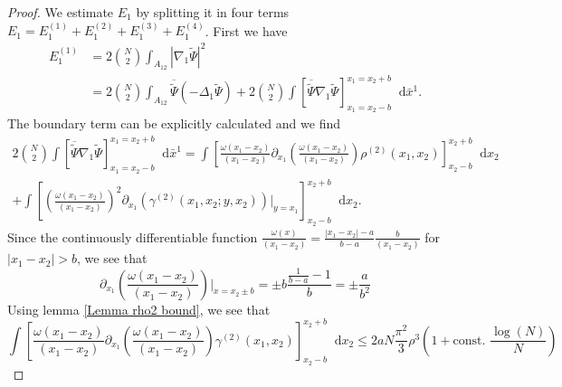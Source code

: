 \documentclass[a4paper,11pt]{article}
\newcommand{\abs}[1]{\left\lvert #1 \right\rvert}
\newcommand*\diff{\mathop{}\!\mathrm{d}}
\numberwithin{equation}{section}
\begin{document}
		\begin{proof}
		We estimate $ E_1 $ by splitting it in four terms $ E_1=E_1^{(1)}+E_1^{(2)}+E_1^{(3)}+E_1^{(4)} $. First we have \begin{equation}
		\begin{aligned}
		E_1^{(1)}&=2\binom{N}{2}\int_{A_{12}}\abs{\nabla_1\tilde{\Psi}}^2\\&
		=2\binom{N}{2}\int_{A_{12}}\overline{\tilde{\Psi}}\left( -\Delta_1 \tilde{\Psi} \right)+2\binom{N}{2}\int\left[\overline{\tilde{\Psi}}\nabla_1\tilde{\Psi}\right]_{x_1=x_2-b}^{x_1=x_2+b}\diff \bar{x}^1.
		\end{aligned}
		\end{equation}
		The boundary term can be explicitly calculated and we find \begin{equation}
		\begin{aligned}
		2\binom{N}{2}\int\left[\overline{\tilde{\Psi}}\nabla_1\tilde{\Psi}\right]_{x_1=x_2-b}^{x_1=x_2+b}\diff \bar{x}^1=\int\left[\frac{\omega(x_1-x_2)}{(x_1-x_2)}\partial_{x_1}\left(\frac{\omega(x_1-x_2)}{(x_1-x_2)}\right)\rho^{(2)}(x_1,x_2)\right]_{x_2-b}^{x_2+b}\diff x_2\\+\int\left[\left(\frac{\omega(x_1-x_2)}{(x_1-x_2)}\right)^2\partial_{x_1}\left(\gamma^{(2)}(x_1,x_2;y,x_2)\right)\bigg\vert_{y=x_1}\right]_{x_2-b}^{x_2+b}\diff x_2.
		\end{aligned}
		\end{equation}
		Since the continuously differentiable function $ \frac{\omega(x)}{(x_1-x_2)}=\frac{\abs{x_1-x_2}-a}{b-a}\frac{b}{(x_1-x_2)} $ for $ \abs{x_1-x_2}>b $, we see that \begin{equation}
		\partial_{x_1}\left(\frac{\omega(x_1-x_2)}{(x_1-x_2)}\right)\bigg\vert_{x=x_2\pm b}=\pm b\frac{\frac{1}{b-a}-1}{ b}=\pm\frac{a}{b^2}
		\end{equation}
		Using lemma \ref{Lemma rho2 bound}, we see that \begin{equation}
		\int\left[\frac{\omega(x_1-x_2)}{(x_1-x_2)}\partial_{x_1}\left(\frac{\omega(x_1-x_2)}{(x_1-x_2)}\right)\gamma^{(2)}(x_1,x_2)\right]_{x_2-b}^{x_2+b}\diff x_2\leq 2a N\frac{\pi^2}{3}\rho^3\left(1+\text{const. }\frac{\log(N)}{N}\right)
		\end{equation}
		

\end{proof}
\end{document}
